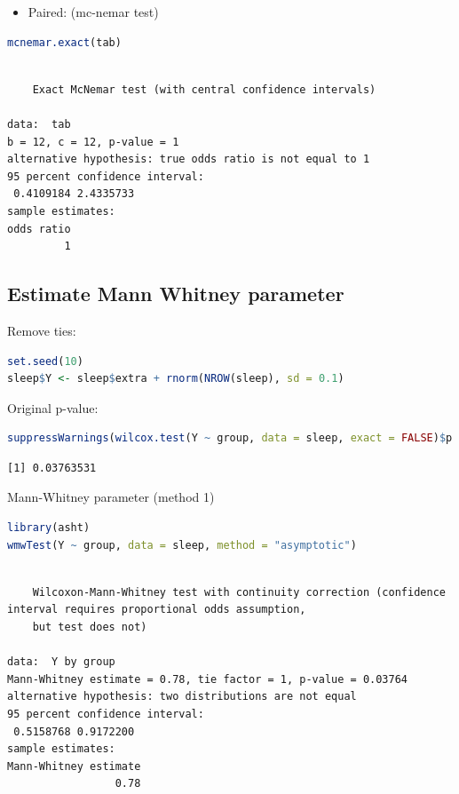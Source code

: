 \documentclass{article}
\begin{document}
\bigskip

\begin{itemize}
\item Paired: (mc-nemar test)
\end{itemize}
\begin{lstlisting}[language=r,numbers=none]
mcnemar.exact(tab) 
\end{lstlisting}

\label{}
\begin{verbatim}

	Exact McNemar test (with central confidence intervals)

data:  tab
b = 12, c = 12, p-value = 1
alternative hypothesis: true odds ratio is not equal to 1
95 percent confidence interval:
 0.4109184 2.4335733
sample estimates:
odds ratio 
         1
\end{verbatim}
\subsection{Estimate Mann Whitney parameter}
\label{sec:org19abe98}

Remove ties:
\begin{lstlisting}[language=r,numbers=none]
set.seed(10)
sleep$Y <- sleep$extra + rnorm(NROW(sleep), sd = 0.1)
\end{lstlisting}

Original p-value:
\begin{lstlisting}[language=r,numbers=none]
suppressWarnings(wilcox.test(Y ~ group, data = sleep, exact = FALSE)$p.value)
\end{lstlisting}

\label{}
\begin{verbatim}
[1] 0.03763531
\end{verbatim}


Mann-Whitney parameter (method 1)
\begin{lstlisting}[language=r,numbers=none]
library(asht)
wmwTest(Y ~ group, data = sleep, method = "asymptotic")
\end{lstlisting}

\label{}
\begin{verbatim}

	Wilcoxon-Mann-Whitney test with continuity correction (confidence interval requires proportional odds assumption,
	but test does not)

data:  Y by group
Mann-Whitney estimate = 0.78, tie factor = 1, p-value = 0.03764
alternative hypothesis: two distributions are not equal
95 percent confidence interval:
 0.5158768 0.9172200
sample estimates:
Mann-Whitney estimate 
                 0.78
\end{verbatim}
\end{document}
